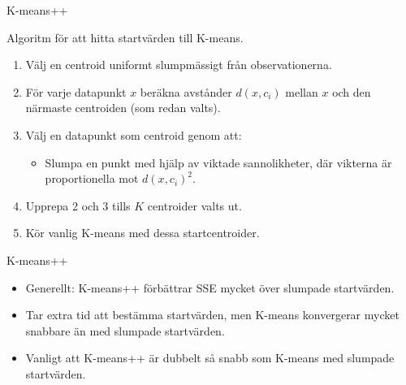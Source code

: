 \documentclass[10pt,english]{beamer}
\begin{document}
\begin{frame}{K-means++}


    Algoritm för att hitta startvärden till K-means.

    \begin{enumerate}
        \item Välj en centroid uniformt slumpmässigt från observationerna.
        \item För varje datapunkt $x$ beräkna avstånder $d(x,c_i)$ mellan $x$ och den närmaste centroiden (som redan valts).
        \item Välj en datapunkt som centroid genom att:
        \begin{itemize}
            \item Slumpa en punkt med hjälp av viktade sannolikheter, där vikterna är proportionella mot $d(x,c_i)^2$.
        \end{itemize}
        \item Upprepa 2 och 3 tills $K$ centroider valts ut.
        \item Kör vanlig K-means med dessa startcentroider.
    \end{enumerate}
    
\end{frame}

\begin{frame}{K-means++}

    \begin{itemize}
        \item Generellt: K-means++ förbättrar SSE mycket över slumpade startvärden.
        \item Tar extra tid att bestämma startvärden, men K-means konvergerar mycket snabbare än med slumpade startvärden.
        \item Vanligt att K-means++ är dubbelt så snabb som K-means med slumpade startvärden.
    \end{itemize}
    
\end{frame}
\end{document}
